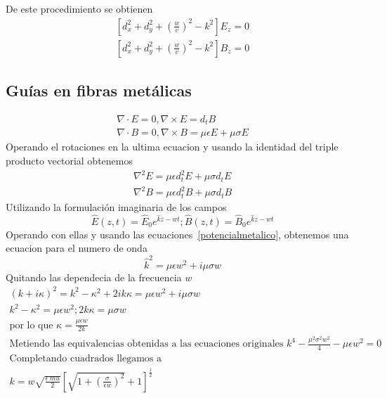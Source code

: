 De este procedimiento se obtienen  
\begin{subequations}\label{Helmholtz}
	\begin{align}
[d_{x}^2+d_{y}^2+(\frac{w}{v})^2-k^2] E_{z}=0\\
[d_{x}^2+d_{y}^2+(\frac{w}{v})^2-k^2] B_{z}=0
	\end{align}
\end{subequations}
\subsection{Guías en fibras metálicas}
\begin{subequations}
	\begin{align} \label{mawxellmetalicas}
	\nabla \cdot E= 0 , \nabla \times E = d_{t}B\\
	\nabla \cdot B=0, \nabla \times B = \mu \epsilon E + \mu \sigma E  
	\end{align}
	\end{subequations}
Operando el rotaciones en la ultima ecuacion y usando la identidad del triple producto vectorial obtenemos
\begin{subequations}\label{potencialmetalico}
\begin{align}
	\nabla^2 E=\mu \epsilon d_{t}^2E+\mu\sigma d_{t} E \\
	\nabla^2 B=\mu \epsilon d_{t}^2B+\mu\sigma d_{t} B 
\end{align}
\end{subequations}
Utilizando la formulación imaginaria de los campos
\begin{equation}
	\widehat{E}(z,t)=\widehat{E}_{0} e^{\hat{k}z-wt} ; \widehat{B}(z,t)=\widehat{B}_{0} e^{\hat{k}z-wt} 
\end{equation}
Operando con ellas y usando las ecuaciones~\ref{potencialmetalico}, obtenemos una ecuacion para
el numero de onda
\begin{equation}
\widehat{k}^2=\mu \epsilon w^2 + i \mu \sigma w
\end{equation}
Quitando las dependecia de la frecuencia $w$ 
\begin{subequations}
	\begin{align}
	(k+i\kappa)^2=k^2-\kappa^2+2ik\kappa=\mu\epsilon w^2+i\mu\sigma w \\
	k^2 - \kappa^2 = \mu \epsilon w^2 ; 2 k \kappa = \mu \sigma w \\
	\text{por lo que } \kappa=\frac{\mu \epsilon w}{2 k}\\
	\text{Metiendo las equivalencias obtenidas a las ecuaciones originales } k^4 - \frac{\mu^2 \sigma^2 w^2}{4} - \mu \epsilon w^2=0 \\
	\text{Completando cuadrados llegamos a } \\
	 k= w \sqrt{\frac{\epsilon \ mu}{2}} [\sqrt{1+(\frac{\sigma}{\epsilon w})^2}+1]^\frac{1}{2}
	\end{align}
\end{subequations}
